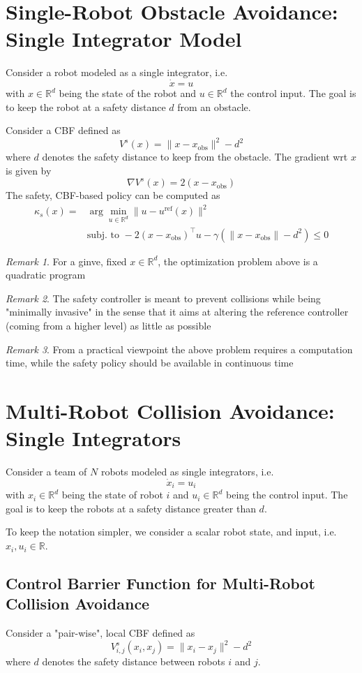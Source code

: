 \documentclass{book}
\newcommand{\R}{\mathbb{R}}
\theoremstyle{theoremv2}
\theoremstyle{defv2}
\theoremstyle{remark}
\newtheorem*{remark}{Remark}
\theoremstyle{remark}
\theoremstyle{definition}
\theoremstyle{definition}
\begin{document}
\section{Single-Robot Obstacle Avoidance: Single Integrator Model}
Consider a robot modeled as a single integrator, i.e. 
\[
    \dot{x} = u
\]
with $x\in\R^d$ being the state of the robot and $u\in\R^d$ the control input. The goal is to keep the robot at a safety distance $d$ from an obstacle.

Consider a CBF defined as 
\[
    V^s(x) = \| x - x_{\text{obs}}\|^2 - d^2
\]
where $d$ denotes the safety distance to keep from the obstacle. The gradient wrt $x$ is given by 
\[
    \nabla V^s(x)  = 2(x-x_\text{obs})
\]
The safety, CBF-based policy can be computed as 
\begin{align*}
    \kappa_s (x) = &\arg \min_{u\in\R^d} \|u-u^\text{ref}(x)\|^2\\
    & \text{subj. to } -2(x-x_\text{obs})^\top u - \gamma(\|x-x_\text{obs}\|-d^2) \leq 0
\end{align*}
\begin{remark}
For a ginve, fixed $x\in\R^d$, the optimization problem above is a quadratic program    
\end{remark}
\begin{remark}
    The safety controller is meant to prevent collisions while being "minimally invasive" in the sense that it aims at altering the reference controller (coming from a higher level) as little as possible
\end{remark}
\begin{remark}
    From a practical viewpoint the above problem requires a computation time, while the safety policy should be available in continuous time
\end{remark}


\section{Multi-Robot Collision Avoidance: Single Integrators}
Consider a team of $N$ robots modeled as single integrators, i.e.
\[
    \dot{x}_i = u_i
\]
with $x_i\in\R^d$ being the state of robot $i$ and $u_i\in\R^d$ being the control input. The goal is to keep the robots at a safety distance greater than $d$.

To keep the notation simpler, we consider a scalar robot state, and input, i.e. $x_i,u_i\in\R$.


\subsection{Control Barrier Function for Multi-Robot Collision Avoidance}
Consider a "pair-wise", local CBF defined as 
\[
    V_{i,j}^s (x_i,x_j) = \|x_i-x_j\|^2 - d^2
\]
where $d$ denotes the safety distance between robots $i$ and $j$. 
\end{document}
